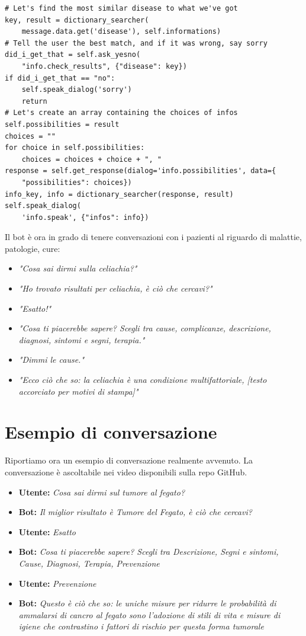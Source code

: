 \begin{verbatim}
# Let's find the most similar disease to what we've got
key, result = dictionary_searcher(
    message.data.get('disease'), self.informations)
# Tell the user the best match, and if it was wrong, say sorry
did_i_get_that = self.ask_yesno(
    "info.check_results", {"disease": key})
if did_i_get_that == "no":
    self.speak_dialog('sorry')
    return
# Let's create an array containing the choices of infos
self.possibilities = result
choices = ""
for choice in self.possibilities:
    choices = choices + choice + ", "
response = self.get_response(dialog='info.possibilities', data={
    "possibilities": choices})
info_key, info = dictionary_searcher(response, result)
self.speak_dialog(
    'info.speak', {"infos": info})
\end{verbatim}
Il bot è ora in grado di tenere conversazioni con i pazienti al riguardo di malattie, patologie, cure:
\begin{itemize}
    \item \textit{"Cosa sai dirmi sulla celiachia?"}
    \item \textit{"Ho trovato risultati per celiachia, è ciò che cercavi?"}
    \item \textit{"Esatto!"}
    \item \textit{"Cosa ti piacerebbe sapere? Scegli tra cause, complicanze, descrizione, diagnosi, sintomi e segni, terapia."}
    \item \textit{"Dimmi le cause."}
    \item \textit{"Ecco ciò che so: la celiachia è una condizione multifattoriale, [testo accorciato per motivi di stampa]"}
\end{itemize}
\section{Esempio di conversazione}
Riportiamo ora un esempio di conversazione realmente avvenuto. La conversazione è ascoltabile nei video disponibili sulla repo GitHub\cite{media:videos}.
\begin{itemize}
    \item \textbf{Utente:} \textit{Cosa sai dirmi sul tumore al fegato?}
    \item \textbf{Bot:} \textit{Il miglior risultato è Tumore del Fegato, è ciò che cercavi?}
    \item \textbf{Utente:} \textit{Esatto}
    \item \textbf{Bot:} \textit{Cosa ti piacerebbe sapere? Scegli tra Descrizione, Segni e sintomi, Cause, Diagnosi, Terapia, Prevenzione}
    \item \textbf{Utente:} \textit{Prevenzione}
    \item \textbf{Bot:} \textit{Questo è ciò che so: le uniche misure per ridurre le probabilità di ammalarsi di cancro al fegato sono l'adozione di stili di vita e misure di igiene che contrastino i fattori di rischio per questa forma tumorale}
\end{itemize}
